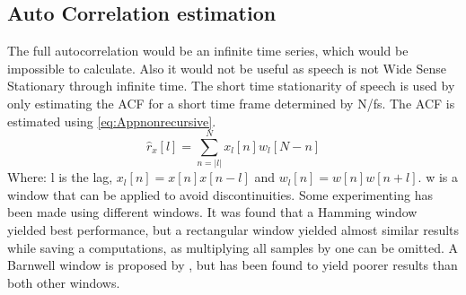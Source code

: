 \subsection{Auto Correlation estimation}
The full autocorrelation would be an infinite time series, which would be impossible to calculate. Also it would not be useful as speech is not Wide Sense Stationary through infinite time. The short time stationarity of speech is used by only estimating the ACF for a short time frame determined by N/fs. The ACF is estimated using \autoref{eq:Appnonrecursive}.
\begin{equation}\label{eq:Appnonrecursive}
\hat{r}_x[l] = \sum^{N}_{n=\left| l\right|} x_l[n]w_l[N-n]
\end{equation}
Where: l is the lag, $x_l[n]=x[n]x[n-l]$ and $w_l[n]=w[n]w[n+l]$. w is a window that can be applied to avoid discontinuities. Some experimenting has been made using different windows. It was found that a Hamming window yielded best performance, but a rectangular window yielded almost similar results while saving a computations, as multiplying all samples by one can be omitted. A Barnwell window is proposed by \cite{Speech}, but has been found to yield poorer results than both other windows.   

